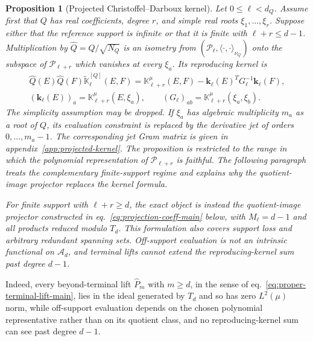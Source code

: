 \documentclass[a4paper,11pt]{article}
\newtheorem{proposition}{Proposition}[section]
\theoremstyle{definition}
\theoremstyle{remark}
\newcommand{\cA}{\mathcal A}
\newcommand{\cP}{\mathcal P}
\newcommand{\tK}{\widetilde{\mathbb K}}
\newcommand{\Qhat}{\widehat Q}
\begin{document}
\begin{proposition}[Projected Christoffel--Darboux kernel]
\label{prop:projected-kernel-main}
Let $0\le\ell<d_Q$. Assume first that $Q$ has real coefficients, degree $r$, and simple real roots
$\xi_1,\ldots,\xi_r$. Suppose either that the reference support is infinite or that it is finite with $\ell+r\le d-1$. Multiplication by
$\Qhat=Q/\sqrt{N_Q}$ is an isometry from
$(\cP_\ell,\langle\cdot,\cdot\rangle_{\nu_Q})$
onto the subspace of $\cP_{\ell+r}$ which vanishes at every $\xi_a$. Its reproducing kernel is 
\begin{equation}
\begin{gathered}
   \Qhat(E)\Qhat(F)
   \tK_\ell^{[Q]}(E,F)
   =
   \mathbb K_{\ell+r}^{\mu}(E,F)
   -
   \mathbf k_\ell(E)^T
   G_\ell^{-1}
   \mathbf k_\ell(F),\\
   (\mathbf k_\ell(E))_a
   =
   \mathbb K_{\ell+r}^{\mu}(E,\xi_a),
   \qquad
   (G_\ell)_{ab}
   =
   \mathbb K_{\ell+r}^{\mu}(\xi_a,\xi_b).
\end{gathered}
   \label{eq:projected-kernel-main}
\end{equation}
The simplicity assumption may be dropped. If $\xi_a$ has algebraic multiplicity $m_a$ as a root of $Q$, its evaluation constraint is replaced by the derivative jet of orders
$0,\ldots,m_a-1$. The corresponding jet Gram matrix is given in appendix~\ref{app:projected-kernel}. 
The proposition is restricted to the range in which the polynomial representation of $\cP_{\ell+r}$ is faithful. The following paragraph treats the complementary finite-support regime and explains why the quotient-image projector replaces the kernel formula.

For finite support with $\ell+r\ge d$, the exact object is instead the quotient-image projector constructed in eq.~\eqref{eq:projection-coeff-main} below, with $M_\ell=d-1$ and all products reduced modulo $T_d$. This formulation also covers support loss and arbitrary redundant spanning sets. Off-support evaluation is not an intrinsic functional on $\cA_d$, and terminal lifts cannot extend the reproducing-kernel sum past degree $d-1$.
\end{proposition}
Indeed, every beyond-terminal lift $\widehat P_m$ with $m\ge d$, in the sense of eq.~\eqref{eq:proper-terminal-lift-main}, lies in the ideal generated by $T_d$ and so has zero $L^2(\mu)$ norm, while off-support evaluation depends on the chosen polynomial representative rather than on its quotient class, and no reproducing-kernel sum can see past degree $d-1$.
\end{document}
